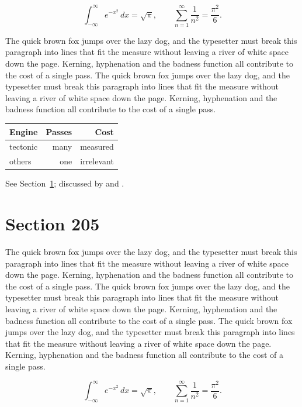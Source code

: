 \documentclass{article}
\begin{document}
\begin{equation}\label{eq:204}
\int_{-\infty}^{\infty} e^{-x^{2}}\,dx = \sqrt{\pi}, \qquad
\sum_{n=1}^{\infty} \frac{1}{n^{2}} = \frac{\pi^{2}}{6}.
\end{equation}

The quick brown fox jumps over the lazy dog, and the typesetter must break this paragraph into lines that fit the measure without leaving a river of white space down the page. Kerning, hyphenation and the badness function all contribute to the cost of a single pass. The quick brown fox jumps over the lazy dog, and the typesetter must break this paragraph into lines that fit the measure without leaving a river of white space down the page. Kerning, hyphenation and the badness function all contribute to the cost of a single pass. 

\begin{center}
\begin{tabular}{lrr}
\toprule
Engine & Passes & Cost \\
\midrule
tectonic & many & measured \\
others & one & irrelevant \\
\bottomrule
\end{tabular}
\end{center}

See Section~\ref{sec:205}; discussed by \textcite{k5} and \textcite{l2}.
\section{Section 205}
\label{sec:205}
The quick brown fox jumps over the lazy dog, and the typesetter must break this paragraph into lines that fit the measure without leaving a river of white space down the page. Kerning, hyphenation and the badness function all contribute to the cost of a single pass. The quick brown fox jumps over the lazy dog, and the typesetter must break this paragraph into lines that fit the measure without leaving a river of white space down the page. Kerning, hyphenation and the badness function all contribute to the cost of a single pass. The quick brown fox jumps over the lazy dog, and the typesetter must break this paragraph into lines that fit the measure without leaving a river of white space down the page. Kerning, hyphenation and the badness function all contribute to the cost of a single pass. 

\begin{equation}\label{eq:205}
\int_{-\infty}^{\infty} e^{-x^{2}}\,dx = \sqrt{\pi}, \qquad
\sum_{n=1}^{\infty} \frac{1}{n^{2}} = \frac{\pi^{2}}{6}.
\end{equation}
\end{document}

